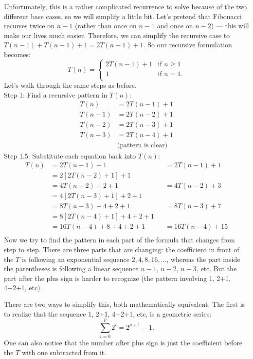 \documentclass [letterpaper,12pt]{article}
\begin{document}
Unfortunately, this is a rather complicated recurrence to solve because of the two different base cases, so we will simplify
a little bit.  Let's pretend that Fibonacci recurses twice on $n-1$ (rather than once on $n-1$ and once on $n-2$) ---
this will make our lives much easier.  Therefore, we can simplify the recursive case to $T(n-1) + T(n-1)+1=2T(n-1)+1$.
So our recursive formulation becomes:
\[ 
T(n) = \begin{cases}
2T(n-1) + 1 & \text{if } n \geq 1 \\
1 &\text{if } n=1.\\
\end{cases} 
\]
Let's walk through the same steps as before.
\\
Step 1: Find a recursive pattern in $T(n)$:
\begin{align*}
T(n) &= 2T(n-1) + 1 \\
T(n-1) &= 2T(n-2) + 1 \\
T(n-2) &= 2T(n-3) + 1 \\
T(n-3) &= 2T(n-4) + 1 \\
&\text{(pattern is clear)}
\end{align*}
Step 1.5: Substitute each equation back into $T(n)$:
\begin{align*}
T(n) &= 2T(n-1) + 1 &&= 2T(n-1) + 1\\
&= 2\left[2T(n-2) + 1\right] + 1 \\
&= 4T(n-2) + 2 + 1 && = 4T(n-2) + 3\\
&= 4\left[2T(n-3) + 1\right] + 2 + 1 \\
&= 8T(n-3) + 4 + 2 + 1 &&= 8T(n-3) + 7\\
&= 8\left[2T(n-4) + 1\right] + 4 + 2 + 1 \\
&= 16T(n-4) + 8 + 4 + 2 + 1 &&= 16T(n-4) + 15\\
\end{align*}
Now we try to find the pattern in each part of the formula that changes from step to step.  There are three parts
that are changing:   the coefficient in front of the $T$ is following an exponential
sequence $2, 4, 8, 16, \ldots$, whereas the part inside the parentheses is following a linear sequence $n-1$,
$n-2$, $n-3$, etc.  But the part after the plus sign is harder to recognize (the pattern involving 1, 2+1, 4+2+1, etc).

 There are two ways to simplify this, both mathematically equivalent.
The first is to realize that the sequence 1, 2+1, 4+2+1, etc, is a geometric series:
\[ \sum_{i=0}^p 2^i = 2^{p+1}-1.\]
One can also notice that the number after plus sign is just the coefficient before the $T$ with one subtracted from it.
\end{document}
